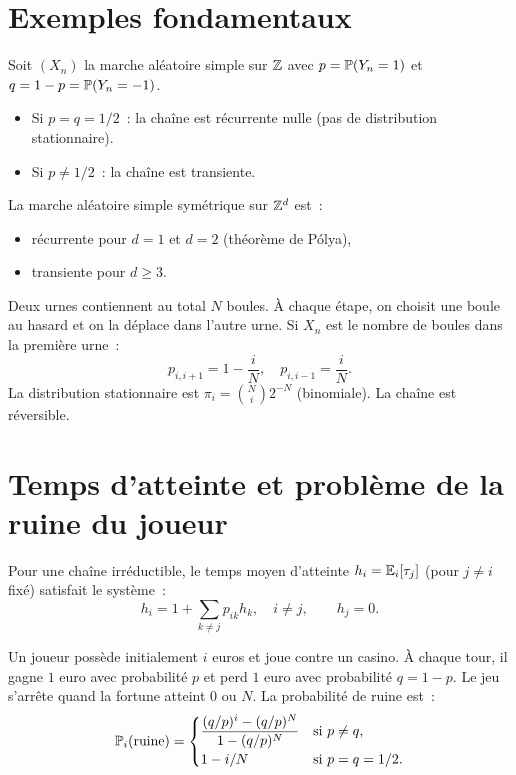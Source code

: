 \section{Exemples fondamentaux}

\begin{exemple}
Soit $(X_n)$ la marche al\'eatoire simple sur $\mathbb{Z}$ avec $p = \mathbb{P}(Y_n = 1)$ et
$q = 1 - p = \mathbb{P}(Y_n = -1)$.
\begin{itemize}
  \item Si $p = q = 1/2$~: la cha\^ine est r\'ecurrente nulle (pas de distribution
    stationnaire).
  \item Si $p \neq 1/2$~: la cha\^ine est transiente.
\end{itemize}
\end{exemple}

\begin{exemple}
La marche al\'eatoire simple sym\'etrique sur $\mathbb{Z}^d$ est~:
\begin{itemize}
  \item r\'ecurrente pour $d = 1$ et $d = 2$ (th\'eor\`eme de P\'olya),
  \item transiente pour $d \geq 3$.
\end{itemize}
\end{exemple}

\begin{exemple}
Deux urnes contiennent au total $N$ boules. \`A chaque \'etape, on choisit une
boule au hasard et on la d\'eplace dans l'autre urne. Si $X_n$ est le nombre de
boules dans la premi\`ere urne~:
\[
  p_{i,i+1} = 1 - \frac{i}{N}, \quad p_{i,i-1} = \frac{i}{N}.
\]
La distribution stationnaire est $\pi_i = \binom{N}{i} 2^{-N}$ (binomiale).
La cha\^ine est r\'eversible.
\end{exemple}

\section{Temps d'atteinte et probl\`eme de la ruine du joueur}

\begin{proposition}
Pour une cha\^ine irr\'eductible, le temps moyen d'atteinte
$h_i = \mathbb{E}_i[\tau_j]$ (pour $j \neq i$ fix\'e) satisfait le syst\`eme~:
\[
  h_i = 1 + \sum_{k \neq j} p_{ik} h_k, \quad i \neq j, \qquad h_j = 0.
\]
\end{proposition}

\begin{exemple}
Un joueur poss\`ede initialement $i$ euros et joue contre un casino. \`A chaque
tour, il gagne $1$ euro avec probabilit\'e $p$ et perd $1$ euro avec probabilit\'e
$q = 1-p$. Le jeu s'arr\^ete quand la fortune atteint $0$ ou $N$. La probabilit\'e
de ruine est~:
\[
  \mathbb{P}_i(\text{ruine}) = \begin{cases}
    \displaystyle \frac{(q/p)^i - (q/p)^N}{1 - (q/p)^N} & \text{si } p \neq q, \\[6pt]
    1 - i/N & \text{si } p = q = 1/2.
  \end{cases}
\]
\end{exemple}

